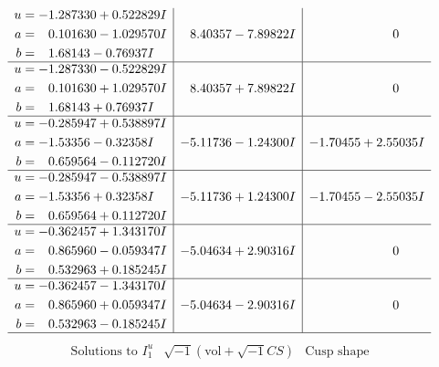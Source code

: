 \documentclass[1p]{elsarticle_modified}
\theoremstyle{definition}
\newcommand{\I}{\sqrt{-1}}
\begin{document}
$$\begin{array}{c|c|c}
\begin{aligned}
u &= -1.287330 + 0.522829 I \\
a &= \phantom{-}0.101630 - 1.029570 I \\
b &= \phantom{-}1.68143 - 0.76937 I\end{aligned}
 & \phantom{-}8.40357 - 7.89822 I & \phantom{-0.000000 } 0 \\ \hline\begin{aligned}
u &= -1.287330 - 0.522829 I \\
a &= \phantom{-}0.101630 + 1.029570 I \\
b &= \phantom{-}1.68143 + 0.76937 I\end{aligned}
 & \phantom{-}8.40357 + 7.89822 I & \phantom{-0.000000 } 0 \\ \hline\begin{aligned}
u &= -0.285947 + 0.538897 I \\
a &= -1.53356 - 0.32358 I \\
b &= \phantom{-}0.659564 - 0.112720 I\end{aligned}
 & -5.11736 - 1.24300 I & -1.70455 + 2.55035 I \\ \hline\begin{aligned}
u &= -0.285947 - 0.538897 I \\
a &= -1.53356 + 0.32358 I \\
b &= \phantom{-}0.659564 + 0.112720 I\end{aligned}
 & -5.11736 + 1.24300 I & -1.70455 - 2.55035 I \\ \hline\begin{aligned}
u &= -0.362457 + 1.343170 I \\
a &= \phantom{-}0.865960 - 0.059347 I \\
b &= \phantom{-}0.532963 + 0.185245 I\end{aligned}
 & -5.04634 + 2.90316 I & \phantom{-0.000000 } 0 \\ \hline\begin{aligned}
u &= -0.362457 - 1.343170 I \\
a &= \phantom{-}0.865960 + 0.059347 I \\
b &= \phantom{-}0.532963 - 0.185245 I\end{aligned}
 & -5.04634 - 2.90316 I & \phantom{-0.000000 } 0\\
 \hline 
 \end{array}$$\newpage$$\begin{array}{c|c|c}  
\text{Solutions to }I^u_{1}& \I (\text{vol} + \sqrt{-1}CS) & \text{Cusp shape}\\
 \hline 
\begin{aligned}

\end{aligned}
\end{array}$$
\end{document}
